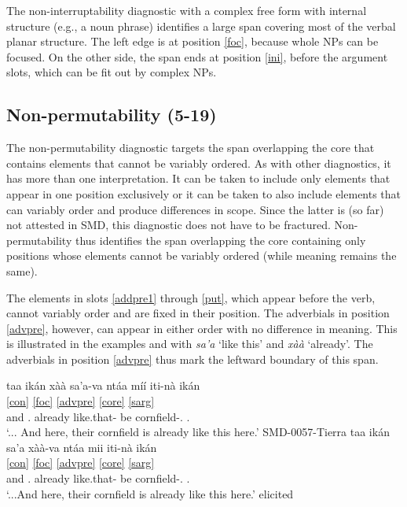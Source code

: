 \documentclass[output=paper]{langscibook}
\begin{document}
The non-interruptability diagnostic with a complex free form with internal structure (e.g., a noun phrase) identifies a large span covering most of the verbal planar structure. 
The left edge is at position \ref{foc}, because whole NPs can be focused.
On the other side, the span ends at position \ref{ini}, before the argument slots, which can be fit out by complex NPs. 


\subsection{Non-permutability (5-19)} %
\label{sub:nonpermutability}

The non-permutability diagnostic targets the span overlapping the core that contains elements that cannot be variably ordered. As with other diagnostics, it has more than one interpretation.
It can be taken to include only elements that appear in one position exclusively or it can be taken to also include elements that can variably order and produce differences in scope.
Since the latter is (so far) not attested in SMD, this diagnostic does not have to be fractured. 
Non-permutability thus identifies the span overlapping the core containing only positions whose elements cannot be variably ordered (while meaning remains the same).

The elements in slots \ref{addpre1} through \ref{put}, which appear before the verb, cannot variably order and are fixed in their position. The adverbials in position \ref{advpre}, however, can appear in either order with no difference in meaning. This is illustrated in the examples  and   with \textit{sa'a} `like this' and \textit{xàà} `already'. The adverbials in position \ref{advpre} thus mark the leftward boundary of this span.

\ea \label{ex:permutableadv}
    \ea \label{ex:permutableadv1}
    \glll taa ikán xàà sa'a-va ntáa míí iti-nà ikán \\
          \ref{con} \ref{foc} \ref{advpre} {} \ref{core} \ref{sarg} {} {} \\
        and \Dem.\Prox{} already like.that-\Add{} be \Top{} cornfield-\Tpl.\Hum{} \Dem.\Prox{} \\
        \glt `... And here, their cornfield is already like this here.' \hfill SMD-0057-Tierra
    \ex \label{ex:permutableadv2}
    \glll taa ikán sa'a xàà-va ntáa mii iti-nà ikán \\
          \ref{con} \ref{foc} \ref{advpre} {} \ref{core} \ref{sarg} {} {} \\
        and \Dem.\Prox{} already like.that-\Add{} be \Top{} cornfield-\Tpl.\Hum{} \Dem.\Prox{} \\
        \glt `...And here, their cornfield is already like this here.' \hfill elicited
    \z
\z
\end{document}
